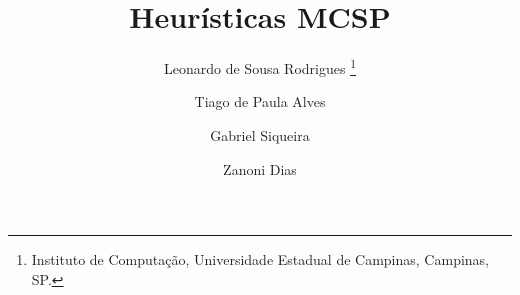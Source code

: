 \documentclass[11pt,twoside]{article}
\begin{document}




    \TRMakeCover


    \pagestyle{myheadings}

    \title{Heurísticas MCSP}

    \author{
        Leonardo de Sousa Rodrigues%
        \thanks{Instituto de Computação, Universidade Estadual de Campinas, Campinas, SP.}
        \and
        Tiago de Paula Alves\footnotemark[1]
        \and
        Gabriel Siqueira\footnotemark[1]
        \and
        Zanoni Dias\footnotemark[1]
    }

    \date{}

    \maketitle
\end{document}
